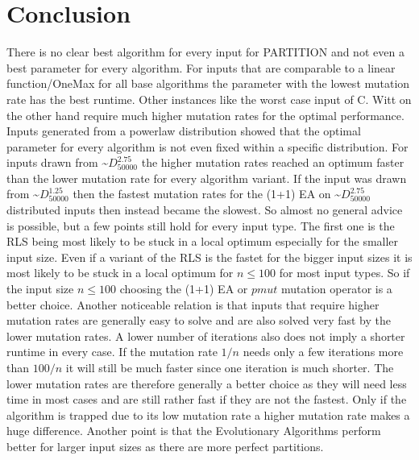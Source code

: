 
\chapter{Conclusion}
\label{ch:conclusion}

There is no clear best algorithm for every input for PARTITION and not even a best parameter for every algorithm.
For inputs that are comparable to a linear function/OneMax for all base algorithms the parameter with the lowest mutation rate has the best runtime.
Other instances like the worst case input of C. Witt on the other hand require much higher mutation rates for the optimal performance.
Inputs generated from a powerlaw distribution showed that the optimal parameter for every algorithm is not even fixed within a specific distribution.
For inputs drawn from \textasciitilde$D^{2.75}_{50000}$ the higher mutation rates reached an optimum faster than the lower mutation rate for every algorithm variant.
If the input was drawn from \textasciitilde$D^{1.25}_{50000}$ then the fastest mutation rates for the (1+1) EA on \textasciitilde$D^{2.75}_{50000}$ distributed inputs then instead became the slowest.\newline
So almost no general advice is possible, but a few points still hold for every input type.
The first one is the RLS being most likely to be stuck in a local optimum especially for the smaller input size.
Even if a variant of the RLS is the fastet for the bigger input sizes it is most likely to be stuck in a local optimum for $n\le100$ for most input types.
So if the input size $n\le100$ choosing the (1+1) EA or $pmut$ mutation operator is a better choice.
Another noticeable relation is that inputs that require higher mutation rates are generally easy to solve and are also solved very fast by the lower mutation rates.
A lower number of iterations also does not imply a shorter runtime in every case.
If the mutation rate $1/n$ needs only a few iterations more than $100/n$ it will still be much faster since one iteration is much shorter.
The lower mutation rates are therefore generally a better choice as they will need less time in most cases and are still rather fast if they are not the fastest.
Only if the algorithm is trapped due to its low mutation rate a higher mutation rate makes a huge difference.\newline
Another point is that the Evolutionary Algorithms perform better for larger input sizes as there are more perfect partitions.
